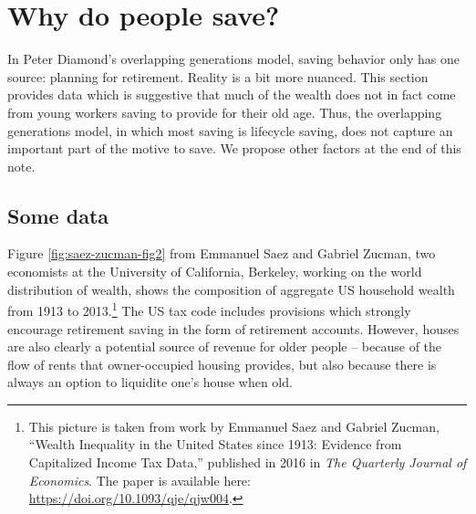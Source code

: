 \documentclass[]{book}
\let\rmarkdownfootnote\footnote%
\def\footnote{\protect\rmarkdownfootnote}
\theoremstyle{definition}
\theoremstyle{definition}
\theoremstyle{definition}
\theoremstyle{remark}
\begin{document}
\section{Why do people save?}\label{why-do-people-save}

In Peter Diamond's overlapping generations model, saving behavior only
has one source: planning for retirement. Reality is a bit more nuanced.
This section provides data which is suggestive that much of the wealth
does not in fact come from young workers saving to provide for their old
age. Thus, the overlapping generations model, in which most saving is
lifecycle saving, does not capture an important part of the motive to
save. We propose other factors at the end of this note.

\subsection{Some data}\label{some-data-1}

Figure \ref{fig:saez-zucman-fig2} from Emmanuel Saez and Gabriel Zucman,
two economists at the University of California, Berkeley, working on the
world distribution of wealth, shows the composition of aggregate US
household wealth from 1913 to 2013.\footnote{This picture is taken from
  work by Emmanuel Saez and Gabriel Zucman, ``Wealth Inequality in the
  United States since 1913: Evidence from Capitalized Income Tax Data,''
  published in 2016 in \emph{The Quarterly Journal of Economics}. The
  paper is available here: \url{https://doi.org/10.1093/qje/qjw004}.}
The US tax code includes provisions which strongly encourage retirement
saving in the form of retirement accounts. However, houses are also
clearly a potential source of revenue for older people -- because of the
flow of rents that owner-occupied housing provides, but also because
there is always an option to liquidite one's house when old.
\end{document}
